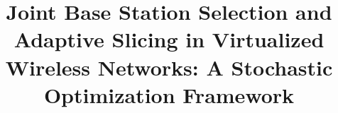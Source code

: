 \documentclass[conference]{IEEEtran}
\begin{document}
%
\title{Joint Base Station Selection and Adaptive Slicing in Virtualized Wireless Networks: A Stochastic Optimization Framework}

\author{
}

\end{document}
